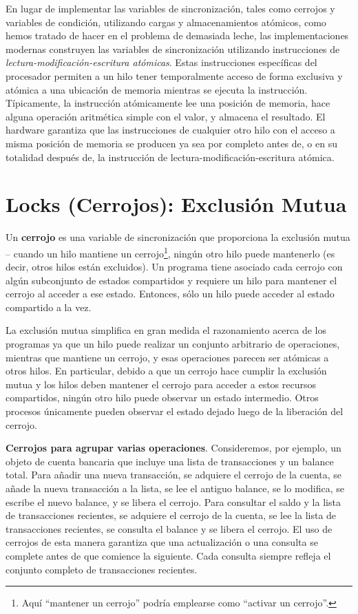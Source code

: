 \documentclass[10pt]{book}
\begin{document}
\begin{itemize}
En lugar de implementar las variables de sincronización, tales como cerrojos y variables de condición, utilizando cargas y almacenamientos atómicos, como hemos tratado de hacer en el problema de demasiada leche, las implementaciones modernas construyen las variables de sincronización utilizando instrucciones de \textit{lectura-modificación-escritura atómicas}. Estas instrucciones específicas del procesador permiten a un hilo tener temporalmente acceso de forma exclusiva y atómica a una ubicación de memoria mientras se ejecuta la instrucción. Típicamente, la instrucción atómicamente lee una posición de memoria, hace alguna operación aritmética simple con el valor, y almacena el resultado. El hardware garantiza que las instrucciones de cualquier otro hilo con el acceso a misma posición de memoria se producen ya sea por completo antes de, o en su totalidad después de, la instrucción de lectura-modificación-escritura atómica.
\end{itemize}


\section{Locks (Cerrojos): Exclusión Mutua}
Un \textbf{cerrojo} es una variable de sincronización que proporciona la exclusión mutua -- cuando un hilo mantiene un cerrojo\footnote{Aquí ``mantener un cerrojo'' podría emplearse como ``activar un cerrojo''.}, ningún otro hilo puede mantenerlo (es decir, otros hilos están excluidos). Un programa tiene asociado cada cerrojo con algún subconjunto de estados compartidos y requiere un hilo para mantener el cerrojo al acceder a ese estado. Entonces, sólo un hilo puede acceder al estado compartido a la vez.

La exclusión mutua simplifica en gran medida el razonamiento acerca de los programas ya que un hilo puede realizar un conjunto arbitrario de operaciones, mientras que mantiene un cerrojo, y esas operaciones parecen ser atómicas a otros hilos. En particular, debido a que un cerrojo hace cumplir la exclusión mutua y los hilos deben mantener el cerrojo para acceder a estos recursos compartidos, ningún otro hilo puede observar un estado intermedio. Otros procesos únicamente pueden observar el estado dejado luego de la liberación del cerrojo.

\textbf{Cerrojos para agrupar varias operaciones}. Consideremos, por ejemplo, un objeto de cuenta bancaria que incluye una lista de transacciones y un balance total. Para añadir una nueva transacción, se adquiere el cerrojo de la cuenta, se añade la nueva transacción a la lista, se lee el antiguo balance, se lo modifica, se escribe el nuevo balance, y se libera el cerrojo. Para consultar el saldo y la lista de transacciones recientes, se adquiere el cerrojo de la cuenta, se lee la lista de transacciones recientes, se consulta el balance y se libera el cerrojo. El uso de cerrojos de esta manera garantiza que una actualización o una consulta se complete antes de que comience la siguiente. Cada consulta siempre refleja el conjunto completo de transacciones recientes.
\end{document}
